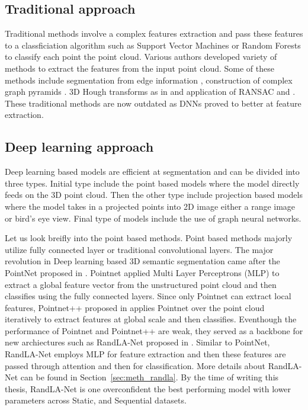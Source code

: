 \subsection{Traditional approach}
Traditional methods involve a complex features extraction and pass these features to a classficiation algorithm such as Support Vector Machines or Random Forests to classify each point the point cloud.
Various authors developed variety of methods to extract the features from the input point cloud.
Some of these methods include segmentation from edge information \cite{bhanu1986range}, construction of complex graph pyramids \cite{koster}.
3D Hough transforms as in \cite{vosselman20013d} and application of RANSAC \cite{schnabel2007efficient} and \cite{tarsha2007hough}.
These traditional methods are now outdated as DNNs proved to better at feature extraction.

\subsection{Deep learning approach}
Deep learning based models are efficient at segmentation and can be divided into three types.
Initial type include the point based models where the model directly feeds on the 3D point cloud.
Then the other type include projection based models where the model takes in a projected points into 2D image either a range image or bird's eye view.
Final type of models include the use of graph neural networks.

Let us look breifly into the point based methods. Point based methods majorly utilize fully connected layer or traditional convolutional layers.
The major revolution in Deep learning based 3D semantic segmentation came after the PointNet proposed in \cite{Qi_2017_CVPR_pointnet}.
Pointnet applied Multi Layer Perceptrons (MLP) to extract a global feature vector from the unstructured point cloud and then classifies using the fully connected layers.
Since only Pointnet can extract local features, Pointnet++ proposed in \cite{qi2017pointnet++} applies Pointnet over the point cloud iteratively to extract features at global scale and then classifies.
Eventhough the performance of Pointnet and Pointnet++ are weak, they served as a backbone for new archiectures such as RandLA-Net proposed in \cite{Hu_2020_CVPR_Randla}.
Similar to PointNet, RandLA-Net employs MLP for feature extraction and then these features are passed through attention and then for classification.
More details about RandLA-Net can be found in Section~\ref{sec:meth_randla}.
By the time of writing this thesis, RandLA-Net is one overconfident the best performing model with lower parameters across Static, and Sequential datasets.

